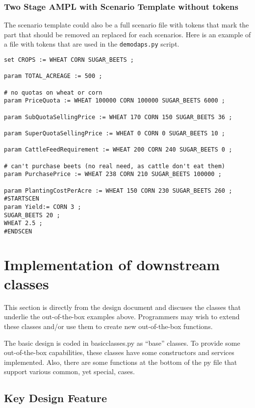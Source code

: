 \documentclass[12pt]{article}
\begin{document}
\subsubsection{Two Stage AMPL with Scenario Template without tokens}

The scenario template could also be a full scenario file with
tokens that mark the part that should be removed an replaced for
each scenarios. Here is an example of a file with tokens
that are used in the \verb|demodaps.py| script.

\begin{verbatim}
set CROPS := WHEAT CORN SUGAR_BEETS ;

param TOTAL_ACREAGE := 500 ;

# no quotas on wheat or corn
param PriceQuota := WHEAT 100000 CORN 100000 SUGAR_BEETS 6000 ;

param SubQuotaSellingPrice := WHEAT 170 CORN 150 SUGAR_BEETS 36 ;

param SuperQuotaSellingPrice := WHEAT 0 CORN 0 SUGAR_BEETS 10 ;

param CattleFeedRequirement := WHEAT 200 CORN 240 SUGAR_BEETS 0 ;

# can't purchase beets (no real need, as cattle don't eat them)
param PurchasePrice := WHEAT 238 CORN 210 SUGAR_BEETS 100000 ;

param PlantingCostPerAcre := WHEAT 150 CORN 230 SUGAR_BEETS 260 ;
#STARTSCEN
param Yield:= CORN 3 ;
SUGAR_BEETS 20 ;
WHEAT 2.5 ;
#ENDSCEN
\end{verbatim}

\newpage
\section{Implementation of downstream classes}

This section is directly from the design document and discuses the
classes that underlie the out-of-the-box examples above. Programmers
may wish to extend these classes and/or use them to create new
out-of-the-box functions.

The basic design is coded in basicclasses.py as ``base'' classes.
To provide some out-of-the-box capabilities, these classes have
some constructors and services implemented. Also, there
are some functions at the bottom of the py file
that support various common, yet special, cases.

\subsection{Key Design Feature}
\end{document}
